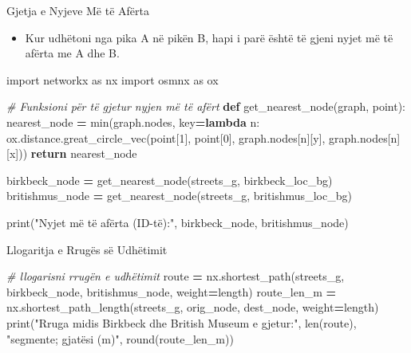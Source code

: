 \documentclass[
  ignorenonframetext,
]{beamer}
\newenvironment{Shaded}{\begin{snugshade}}{\end{snugshade}}
\newcommand{\BuiltInTok}[1]{#1}
\newcommand{\CommentTok}[1]{\textcolor[rgb]{0.56,0.35,0.01}{\textit{#1}}}
\newcommand{\ControlFlowTok}[1]{\textcolor[rgb]{0.13,0.29,0.53}{\textbf{#1}}}
\newcommand{\DecValTok}[1]{\textcolor[rgb]{0.00,0.00,0.81}{#1}}
\newcommand{\ImportTok}[1]{#1}
\newcommand{\KeywordTok}[1]{\textcolor[rgb]{0.13,0.29,0.53}{\textbf{#1}}}
\newcommand{\NormalTok}[1]{#1}
\newcommand{\OperatorTok}[1]{\textcolor[rgb]{0.81,0.36,0.00}{\textbf{#1}}}
\newcommand{\StringTok}[1]{\textcolor[rgb]{0.31,0.60,0.02}{#1}}
\providecommand{\tightlist}{%
  \setlength{\itemsep}{0pt}\setlength{\parskip}{0pt}}
\begin{document}
\begin{frame}[fragile]{Gjetja e Nyjeve Më të Afërta}
\protect\hypertarget{gjetja-e-nyjeve-muxeb-tuxeb-afuxebrta}{}
\begin{itemize}
\tightlist
\item
  Kur udhëtoni nga pika A në pikën B, hapi i parë është të gjeni nyjet
  më të afërta me A dhe B.
\end{itemize}


\begin{Shaded}
\begin{Highlighting}[]
\ImportTok{import}\NormalTok{ networkx }\ImportTok{as}\NormalTok{ nx}
\ImportTok{import}\NormalTok{ osmnx }\ImportTok{as}\NormalTok{ ox}

\CommentTok{\# Funksioni për të gjetur nyjen më të afërt}
\KeywordTok{def}\NormalTok{ get\_nearest\_node(graph, point):}
\NormalTok{    nearest\_node }\OperatorTok{=} \BuiltInTok{min}\NormalTok{(graph.nodes, key}\OperatorTok{=}\KeywordTok{lambda}\NormalTok{ n: ox.distance.great\_circle\_vec(point[}\DecValTok{1}\NormalTok{], point[}\DecValTok{0}\NormalTok{], graph.nodes[n][}\StringTok{\textquotesingle{}y\textquotesingle{}}\NormalTok{], graph.nodes[n][}\StringTok{\textquotesingle{}x\textquotesingle{}}\NormalTok{]))}
    \ControlFlowTok{return}\NormalTok{ nearest\_node}


\NormalTok{birkbeck\_node }\OperatorTok{=}\NormalTok{ get\_nearest\_node(streets\_g, birkbeck\_loc\_bg)}
\NormalTok{britishmus\_node }\OperatorTok{=}\NormalTok{ get\_nearest\_node(streets\_g, britishmus\_loc\_bg)}

\BuiltInTok{print}\NormalTok{(}\StringTok{"Nyjet më të afërta (ID{-}të):"}\NormalTok{, birkbeck\_node, britishmus\_node)}
\end{Highlighting}
\end{Shaded}
\end{frame}

\begin{frame}[fragile]{Llogaritja e Rrugës së Udhëtimit}
\protect\hypertarget{llogaritja-e-rruguxebs-suxeb-udhuxebtimit}{}

\begin{Shaded}
\begin{Highlighting}[]
\CommentTok{\# llogarisni rrugën e udhëtimit}
\NormalTok{route }\OperatorTok{=}\NormalTok{ nx.shortest\_path(streets\_g, birkbeck\_node, britishmus\_node, weight}\OperatorTok{=}\StringTok{\textquotesingle{}length\textquotesingle{}}\NormalTok{)}
\NormalTok{route\_len\_m }\OperatorTok{=}\NormalTok{ nx.shortest\_path\_length(streets\_g, orig\_node, dest\_node, weight}\OperatorTok{=}\StringTok{\textquotesingle{}length\textquotesingle{}}\NormalTok{)}
\BuiltInTok{print}\NormalTok{(}\StringTok{"Rruga midis Birkbeck dhe British Museum e gjetur:"}\NormalTok{, }\BuiltInTok{len}\NormalTok{(route), }\StringTok{"segmente; gjatësi (m)"}\NormalTok{, }\BuiltInTok{round}\NormalTok{(route\_len\_m))}
\end{Highlighting}
\end{Shaded}
\end{frame}
\end{document}
